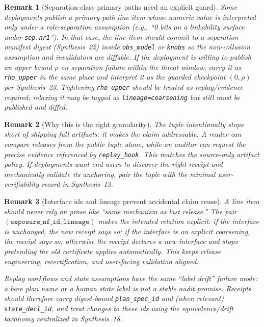 \documentclass[11pt]{article}
\newtheorem{remark}{Remark}
\begin{document}
\begin{remark}[Separation-class primary paths need an explicit guard]
Some deployments publish a primary-path line item whose numeric value is interpreted only under a role-separation assumption (e.g., ``0 bits on a linkability surface under \texttt{sep.nr1}'').
In that case, the line item should commit to a separation-manifest digest (Synthesis~22) inside \texttt{obs\_model} or \texttt{knobs} so the non-collusion assumption and invalidators are diffable.
If the deployment is willing to publish an upper bound $\rho$ on separation failure within the threat window, carry it as \texttt{rho\_upper} in the same place and interpret it as the guarded checkpoint $(0,\rho)$ per Synthesis~23.
Tightening \texttt{rho\_upper} should be treated as replay/evidence-required; relaxing it may be tagged as \texttt{lineage=coarsening} but still must be published and diffed.\cite{series:primarysepmanifest,series:probsep}
\end{remark}

\begin{remark}[Why this is the right granularity]
The tuple intentionally stops short of shipping full artifacts: it makes the claim \emph{addressable}.
A reader can compare releases from the public tuple alone, while an auditor can request the precise evidence referenced by \texttt{replay\_hook}.
This matches the source-only artifact policy.\cite{series:artifactpolicy}
If deployments want end users to \emph{discover} the right receipt and mechanically validate its anchoring, pair the tuple with the minimal user-verifiability record in Synthesis~13.\cite{series:userminiface}
\end{remark}

\begin{remark}[Interface ids and lineage prevent accidental claim reuse]
A line item should never rely on prose like ``same mechanism as last release.''
The pair $(\texttt{exposure\_nf\_id},\texttt{lineage})$ makes the intended relation explicit:
if the interface is unchanged, the new receipt says so; if the interface is an explicit coarsening, the receipt says so; otherwise the receipt declares a new interface and stops pretending the old certificate applies automatically.
This keeps release engineering, recertification, and user-facing validation aligned.

Replay workflows and state assumptions have the same ``label drift'' failure mode: a bare plan name or a human state label is not a stable audit promise.
Receipts should therefore carry digest-bound \texttt{plan\_spec\_id} and (when relevant) \texttt{state\_decl\_id}, and treat changes to these ids using the equivalence/drift taxonomy centralized in Synthesis~18.\cite{series:planstateequiv}
\end{remark}
\end{document}
